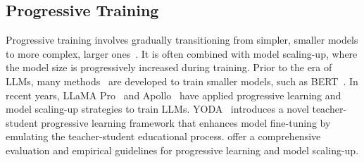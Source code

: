 \subsection{Progressive Training}
Progressive training involves gradually transitioning from simpler, smaller models to more complex, larger ones~\cite{chang2017multi, wen2020autogrow, dong2020towards, wei2016network,fayek2020progressive}. It is often combined with model scaling-up, where the model size is progressively increased during training. Prior to the era of LLMs, many methods~\cite{chen2021bert2bert, gu2020transformer, wang2023learning, yang2020progressively, yao2023masked} are developed to train smaller models, such as BERT~\cite{devlin2018bert}. In recent years, LLaMA Pro~\cite{wu2024llama} and Apollo~\cite{pan2024preparing} have applied progressive learning and model scaling-up strategies to train LLMs. YODA~\cite{lu2024yoda} introduces a novel teacher-student progressive learning framework that enhances model fine-tuning by emulating the teacher-student educational process. \citeauthor{Du2024Stacking} offer a comprehensive evaluation and empirical guidelines for progressive learning and model scaling-up.